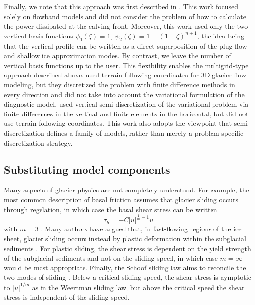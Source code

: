 \documentclass{article}
\theoremstyle{definition}
\theoremstyle{plain}
\begin{document}
Finally, we note that this approach was first described in \citet{bassis2010hamilton}.
This work focused solely on flowband models and did not consider the problem of how to calculate the power dissipated at the calving front.
Moreover, this work used only the two vertical basis functions $\psi_1(\zeta) = 1$, $\psi_2(\zeta) = 1 - (1 - \zeta)^{n + 1}$, the idea being that the vertical profile can be written as a direct superposition of the plug flow and shallow ice approximation modes.
By contrast, we leave the number of vertical basis functions up to the user.
This flexibility enables the multigrid-type approach described above.
\citet{kleiner2014numerical} used terrain-following coordinates for 3D glacier flow modeling, but they discretized the problem with finite difference methods in every direction and did not take into account the variational formulation of the diagnostic model.
\citet{jouvet2015multilayer} used vertical semi-discretization of the variational problem via finite differences in the vertical and finite elements in the horizontal, but did not use terrain-following coordinates.
This work also adopts the viewpoint that semi-discretization defines a family of models, rather than merely a problem-specific discretization strategy.


\subsection{Substituting model components}

Many aspects of glacier physics are not completely understood.
For example, the most common description of basal friction assumes that glacier sliding occurs through regelation, in which case the basal shear stress can be written
\begin{equation}
    \tau_b = -C|u|^{\frac{1}{m} - 1}u
\end{equation}
with $m = 3$ \citep{weertman1957sliding}.
Many authors have argued that, in fast-flowing regions of the ice sheet, glacier sliding occurs instead by plastic deformation within the subglacial sediments \citep{tulaczyk2000basal}.
For plastic sliding, the shear stress is dependent on the yield strength of the subglacial sediments and not on the sliding speed, in which case $m = \infty$ would be most appropriate.
Finally, the Schoof sliding law aims to reconcile the two modes of sliding \citep{schoof2005effect}.
Below a critical sliding speed, the shear stress is aymptotic to $|u|^{1/m}$ as in the Weertman sliding law, but above the critical speed the shear stress is independent of the sliding speed.
\end{document}
